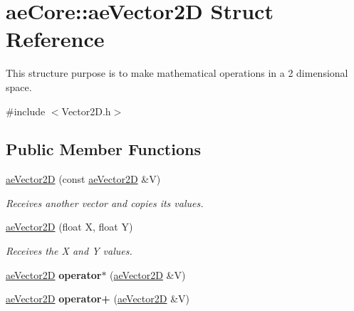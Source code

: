 \hypertarget{structae_core_1_1ae_vector2_d}{}\section{ae\+Core\+:\+:ae\+Vector2D Struct Reference}
\label{structae_core_1_1ae_vector2_d}


This structure purpose is to make mathematical operations in a 2 dimensional space.  




{\ttfamily \#include $<$Vector2\+D.\+h$>$}

\subsection*{Public Member Functions}
\begin{DoxyCompactItemize}
\item 
\hyperlink{structae_core_1_1ae_vector2_d_a96957528e9e1ea4d6576968761b51232}{ae\+Vector2D} (const \hyperlink{structae_core_1_1ae_vector2_d}{ae\+Vector2D} \&V)\hypertarget{structae_core_1_1ae_vector2_d_a96957528e9e1ea4d6576968761b51232}{}\label{structae_core_1_1ae_vector2_d_a96957528e9e1ea4d6576968761b51232}

\begin{DoxyCompactList}\small\item\em Receives another vector and copies its values. \end{DoxyCompactList}\item 
\hyperlink{structae_core_1_1ae_vector2_d_a6fb57a81c9d9569c61780c27cfbdd87a}{ae\+Vector2D} (float X, float Y)\hypertarget{structae_core_1_1ae_vector2_d_a6fb57a81c9d9569c61780c27cfbdd87a}{}\label{structae_core_1_1ae_vector2_d_a6fb57a81c9d9569c61780c27cfbdd87a}

\begin{DoxyCompactList}\small\item\em Receives the X and Y values. \end{DoxyCompactList}\item 
\hyperlink{structae_core_1_1ae_vector2_d}{ae\+Vector2D} {\bfseries operator$\ast$} (\hyperlink{structae_core_1_1ae_vector2_d}{ae\+Vector2D} \&V)\hypertarget{structae_core_1_1ae_vector2_d_a67ba7dd12757e56c6cc661069f57cc67}{}\label{structae_core_1_1ae_vector2_d_a67ba7dd12757e56c6cc661069f57cc67}

\item 
\hyperlink{structae_core_1_1ae_vector2_d}{ae\+Vector2D} {\bfseries operator+} (\hyperlink{structae_core_1_1ae_vector2_d}{ae\+Vector2D} \&V)\hypertarget{structae_core_1_1ae_vector2_d_addc4f8281397677fe7433019c78277cd}{}\label{structae_core_1_1ae_vector2_d_addc4f8281397677fe7433019c78277cd}


\end{DoxyCompactItemize}
